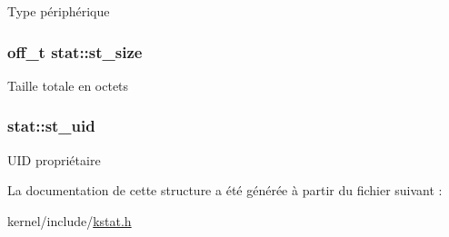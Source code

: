 \-Type périphérique \hypertarget{structstat_a040e19c8b9766f841fde8786ce9297bf}{
\subsubsection[{st\-\_\-size}]{\setlength{\rightskip}{0pt plus 5cm}off\-\_\-t {\bf stat\-::st\-\_\-size}}}\label{structstat_a040e19c8b9766f841fde8786ce9297bf}
\-Taille totale en octets \hypertarget{structstat_a4a8708a3d18be60ee7b2f06c4cab0c70}{
\subsubsection[{st\-\_\-uid}]{ {\bf stat\-::st\-\_\-uid}}}\label{structstat_a4a8708a3d18be60ee7b2f06c4cab0c70}
\-U\-I\-D propriétaire 

\-La documentation de cette structure a été générée à partir du fichier suivant \-:\begin{DoxyCompactItemize}
\item 
kernel/include/\hyperlink{kstat_8h}{kstat.\-h}\end{DoxyCompactItemize}

